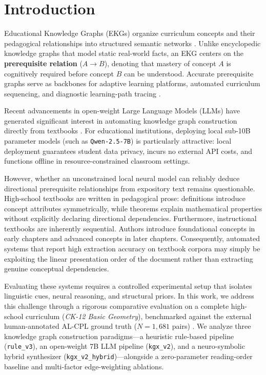 \section{Introduction}
\label{sec:introduction}

Educational Knowledge Graphs (EKGs) organize curriculum concepts and their pedagogical relationships into structured semantic networks \cite{chen2018prereq,ji2021survey}. Unlike encyclopedic knowledge graphs that model static real-world facts, an EKG centers on the \textbf{prerequisite relation} ($A \to B$), denoting that mastery of concept $A$ is cognitively required before concept $B$ can be understood. Accurate prerequisite graphs serve as backbones for adaptive learning platforms, automated curriculum sequencing, and diagnostic learning-path tracing \cite{alzetta2020prereq,roy2019moocs}.

Recent advancements in open-weight Large Language Models (LLMs) have generated significant interest in automating knowledge graph construction directly from textbooks \cite{carta2023iterative,trajanoska2023llm}. For educational institutions, deploying local sub-10B parameter models (such as \texttt{Qwen-2.5-7B}) is particularly attractive: local deployment guarantees student data privacy, incurs no external API costs, and functions offline in resource-constrained classroom settings. 

However, whether an unconstrained local neural model can reliably deduce directional prerequisite relationships from expository text remains questionable. High-school textbooks are written in pedagogical prose: definitions introduce concept attributes symmetrically, while theorems explain mathematical properties without explicitly declaring directional dependencies. Furthermore, instructional textbooks are inherently sequential. Authors introduce foundational concepts in early chapters and advanced concepts in later chapters. Consequently, automated systems that report high extraction accuracy on textbook corpora may simply be exploiting the linear presentation order of the document rather than extracting genuine conceptual dependencies.

Evaluating these systems requires a controlled experimental setup that isolates linguistic cues, neural reasoning, and structural priors. In this work, we address this challenge through a rigorous comparative evaluation on a complete high-school curriculum (\textit{CK-12 Basic Geometry}), benchmarked against the external human-annotated AL-CPL ground truth ($N=1{,}681$ pairs) \cite{liang2015prereq}. We analyze three knowledge graph construction paradigms—a heuristic rule-based pipeline (\texttt{rule\_v3}), an open-weight 7B LLM pipeline (\texttt{kgx\_v2}), and a neuro-symbolic hybrid synthesizer (\texttt{kgx_v2_hybrid})—alongside a zero-parameter reading-order baseline and multi-factor edge-weighting ablations.

